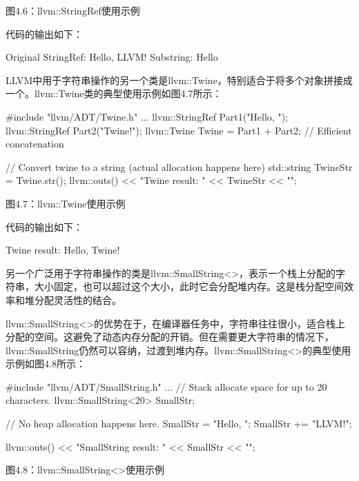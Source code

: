 \begin{center}
图4.6：llvm::StringRef使用示例
\end{center}

代码的输出如下：

\begin{shell}
Original StringRef: Hello, LLVM!
Substring: Hello
\end{shell}

LLVM中用于字符串操作的另一个类是llvm::Twine，特别适合于将多个对象拼接成一个。llvm::Twine类的典型使用示例如图4.7所示：

\begin{cpp}
#include "llvm/ADT/Twine.h"
...
llvm::StringRef Part1("Hello, ");
llvm::StringRef Part2("Twine!");
llvm::Twine Twine = Part1 + Part2;  // Efficient concatenation

// Convert twine to a string (actual allocation happens here)
std::string TwineStr = Twine.str();
llvm::outs() << "Twine result: " << TwineStr << "\n";
\end{cpp}

\begin{center}
图4.7：llvm::Twine使用示例
\end{center}

代码的输出如下：

\begin{shell}
Twine result: Hello, Twine!
\end{shell}

另一个广泛用于字符串操作的类是llvm::SmallString<>，表示一个栈上分配的字符串，大小固定，也可以超过这个大小，此时它会分配堆内存。这是栈分配空间效率和堆分配灵活性的结合。

llvm::SmallString<>的优势在于，在编译器任务中，字符串往往很小，适合栈上分配的空间。这避免了动态内存分配的开销。但在需要更大字符串的情况下，llvm::SmallString仍然可以容纳，过渡到堆内存。llvm::SmallString<>的典型使用示例如图4.8所示：

\begin{cpp}
#include "llvm/ADT/SmallString.h"
...
// Stack allocate space for up to 20 characters.
llvm::SmallString<20> SmallStr;

// No heap allocation happens here.
SmallStr = "Hello, ";
SmallStr += "LLVM!";

llvm::outs() << "SmallString result: " << SmallStr << "\n";
\end{cpp}

\begin{center}
图4.8：llvm::SmallString<>使用示例
\end{center}


